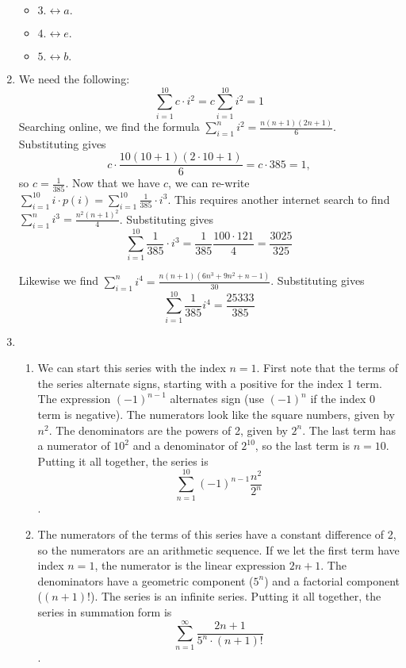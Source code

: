 \documentclass{article}
\begin{document}
\begin{enumerate}
\begin{itemize}
            \item $3.\leftrightarrow a.$
            \item $4.\leftrightarrow e.$
            \item $5.\leftrightarrow b.$
        \end{itemize}
        \item We need the following:
        $$\sum_{i=1}^{10} c\cdot i^2 = c\sum_{i=1}^{10} i^2 = 1$$
        Searching online, we find the formula $\sum_{i=1}^n i^2 = \frac{n(n+1)(2n+1)}{6}$. 
        Substituting gives
        $$c\cdot\frac{10(10+1)(2\cdot 10+1)}{6} = c \cdot 385 =1,$$
        so $c=\frac{1}{385}$. Now that we have $c$, we can re-write $\sum_{i=1}^{10} i\cdot p(i)=\sum_{i=1}^{10} \frac{1}{385}\cdot i^3$.  This requires another internet search to find $\sum_{i=1}^n i^3 = \frac{n^2(n+1)^2}{4}$. Substituting gives $$\sum_{i=1}^{10} \frac{1}{385}\cdot i^3 = \frac{1}{385}\frac{100\cdot121}{4} = \frac{3025}{325}$$
        
        Likewise we find $\sum_{i=1}^ni^4 = \frac{n(n+1)(6n^3+9n^2+n-1)}{30}$. Substituting gives
        \[\sum_{i=1}^{10} \frac{1}{385}i^4= \frac{25333}{385}\]
        
        \item
            \begin{enumerate}
                \item We can start this series with the index $n=1$. First note that the terms of the series alternate signs, starting with a positive for the index 1 term. The expression $(-1)^{n-1}$ alternates sign (use $(-1)^n$ if the index 0 term is  negative). The numerators look like the square numbers, given by $n^2$. The denominators are the powers of 2, given by $2^n$. The last term has a numerator of $10^2$ and a denominator of $2^10$, so the last term is $n=10$. Putting it all together, the series is $$\sum_{n=1}^{10} (-1)^{n-1} \frac{n^2}{2^n}$$.
                \item The numerators of the terms of this series have a constant difference of 2, so the numerators are an arithmetic sequence. If we let the first term have index $n=1$, the numerator is the linear expression $2n+1$. The denominators have a geometric component ($5^n$) and a factorial component ($(n+1)!$). The series is an infinite series. Putting it all together, the series in summation form is 
                $$\sum_{n=1}^{\infty}  \frac{2n+1}{5^n\cdot (n+1)!}$$.
            \end{enumerate}
    \end{enumerate}
\end{document}
